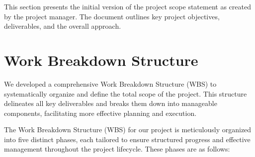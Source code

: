 This section presents the initial version of the project scope statement as created by the project manager. The document outlines key project objectives, deliverables, and the overall approach.



\section{Work Breakdown Structure}

We developed a comprehensive Work Breakdown Structure (WBS) to systematically organize and define the total scope of the project. This structure delineates all key deliverables and breaks them down into manageable components, facilitating more effective planning and execution. 

The Work Breakdown Structure (WBS) for our project is meticulously organized into five distinct phases, each tailored to ensure structured progress and effective management throughout the project lifecycle. These phases are as follows:


